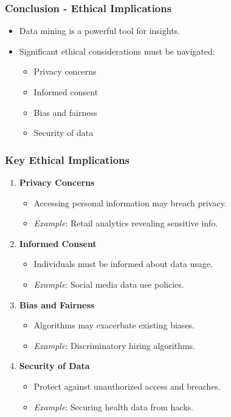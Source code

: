 \documentclass[aspectratio=169]{beamer}
\begin{document}
\begin{frame}[fragile]
  \frametitle{Conclusion - Ethical Implications}
  
  \begin{itemize}
    \item Data mining is a powerful tool for insights.
    \item Significant ethical considerations must be navigated:
    \begin{itemize}
      \item Privacy concerns
      \item Informed consent
      \item Bias and fairness
      \item Security of data
    \end{itemize}
  \end{itemize}
\end{frame}

\begin{frame}[fragile]
  \frametitle{Key Ethical Implications}
  
  \begin{enumerate}
    \item \textbf{Privacy Concerns}
      \begin{itemize}
        \item Accessing personal information may breach privacy.
        \item \textit{Example}: Retail analytics revealing sensitive info.
      \end{itemize}
      
    \item \textbf{Informed Consent}
      \begin{itemize}
        \item Individuals must be informed about data usage.
        \item \textit{Example}: Social media data use policies.
      \end{itemize}
      
    \item \textbf{Bias and Fairness}
      \begin{itemize}
        \item Algorithms may exacerbate existing biases.
        \item \textit{Example}: Discriminatory hiring algorithms.
      \end{itemize}
    
    \item \textbf{Security of Data}
      \begin{itemize}
        \item Protect against unauthorized access and breaches.
        \item \textit{Example}: Securing health data from hacks.
      \end{itemize}
  \end{enumerate}
\end{frame}
\end{document}
